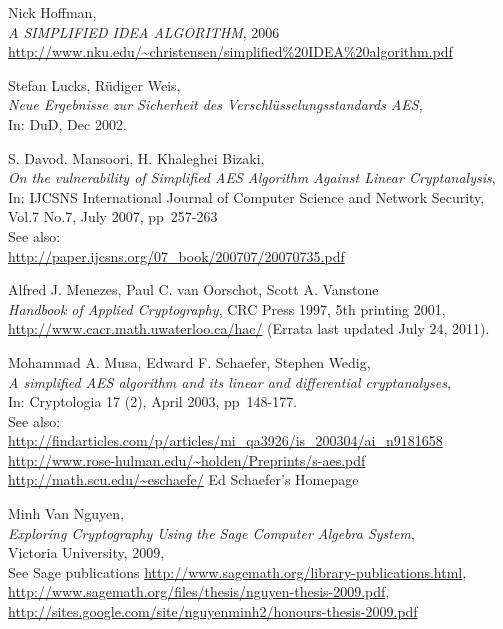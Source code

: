 \begin{thebibliography}{99999}
  
       Nick Hoffman, \\
       {\em A SIMPLIFIED IDEA ALGORITHM},
       2006 \\
       \url{http://www.nku.edu/~christensen/simplified%20IDEA%20algorithm.pdf}

  
       Stefan Lucks, R\"udiger Weis, \\
       {\em Neue Ergebnisse zur Sicherheit des Verschl\"usselungsstandards AES},\\
       In: DuD, Dec 2002.

  
       S. Davod. Mansoori, H. Khaleghei Bizaki, \\
       {\em On the vulnerability of Simplified AES Algorithm Against Linear Cryptanalysis}, \\
       In: IJCSNS International Journal of Computer Science and Network Security, Vol.7 No.7,
           July 2007, pp~257-263 \\
       See also:\\
       \url{http://paper.ijcsns.org/07_book/200707/20070735.pdf}

 
    Alfred J. Menezes, Paul C. van Oorschot, Scott A. Vanstone \\
    {\em Handbook of Applied Cryptography}, 
    CRC Press 1997, 5th printing 2001,\\
    \url{http://www.cacr.math.uwaterloo.ca/hac/} (Errata last updated July 24, 2011).

  
       Mohammad A. Musa, Edward F. Schaefer, Stephen Wedig, \\
       {\em A simplified AES algorithm and its linear and differential cryptanalyses}, \\
       In: Cryptologia 17 (2), April 2003, pp~148-177.\\
       See also:\\
       \url{http://findarticles.com/p/articles/mi_qa3926/is_200304/ai_n9181658}\\
       \url{http://www.rose-hulman.edu/~holden/Preprints/s-aes.pdf}\\
       \url{http://math.scu.edu/~eschaefe/}   Ed Schaefer's Homepage

  
       Minh Van Nguyen, \\
       {\em Exploring Cryptography Using the Sage Computer Algebra System}, \\
       Victoria University, 2009, \\
       See Sage publications \url{http://www.sagemath.org/library-publications.html},\\
       \url{http://www.sagemath.org/files/thesis/nguyen-thesis-2009.pdf},\\
       \url{http://sites.google.com/site/nguyenminh2/honours-thesis-2009.pdf}


\end{thebibliography}
